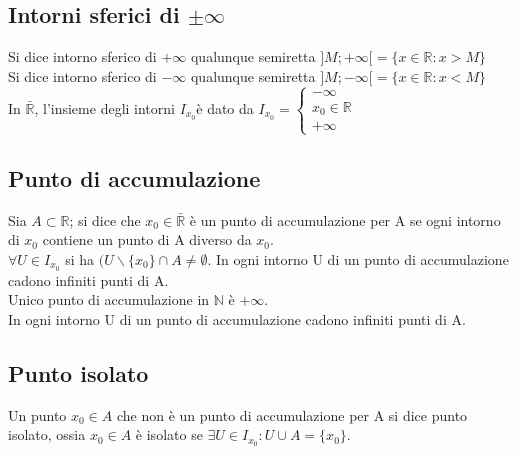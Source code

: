 \subsection{Intorni sferici di $\pm\infty$}
Si dice intorno sferico di $+\infty$ qualunque semiretta $]M;+\infty[=\{ x\in\mathbb{R}:x>M\}$\\
Si dice intorno sferico di $-\infty$ qualunque semiretta $]M;-\infty[=\{x\in\mathbb{R}:x<M\}$\\
In $\bar{\mathbb{R}}$, l'insieme degli intorni $I_{x_0} $\`e dato da $I_{x_0}=\begin{cases}-\infty\\x_0\in\mathbb{R}\\+\infty\end{cases}$%
\subsection{Punto di accumulazione}
Sia $A\subset\mathbb{R}$; si dice che $x_0\in\bar{\mathbb{R}}$ \`e un punto di accumulazione per A se ogni intorno di $x_0$ contiene un punto di A diverso da $x_0$.\\
$\forall U\in I_{x_0}$ si ha $(U\backslash\{x_0\}\cap A\neq \emptyset$. In ogni intorno U di un punto di accumulazione cadono infiniti punti di A.\\
Unico punto di accumulazione in $\mathbb{N}$ \`e $+\infty$.\\
In ogni intorno U di un punto di accumulazione cadono infiniti punti di A.
\subsection{Punto isolato}
Un punto $x_0\in A$ che non \`e un punto di accumulazione per A si dice punto isolato, ossia $x_0\in A$ \`e isolato se $\exists U\in I_{x_0}:U\cup A=\{x_0\}$.\\ 